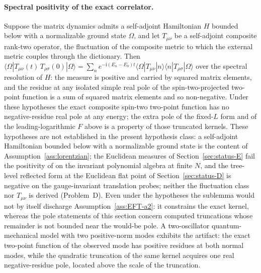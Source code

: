 \paragraph{Spectral positivity of the exact correlator.}
Suppose the matrix dynamics admits a self-adjoint Hamiltonian \(H\)
bounded below with a normalizable ground state \(\Omega\), and let
\(T_{\mu\nu}\) be a self-adjoint composite rank-two operator, the
fluctuation of the composite metric to which the external metric
couples through the dictionary. Then
\(\langle\Omega|T_{\mu\nu}(t)\,T_{\rho\sigma}(0)|\Omega\rangle
=\sum_n e^{-\mathrm i(E_n-E_0)t}
\langle\Omega|T_{\mu\nu}|n\rangle\langle n|T_{\rho\sigma}|\Omega
\rangle\) over the spectral resolution of \(H\): the measure is
positive and carried by squared matrix elements, and the residue at
any isolated simple real pole of the spin-two-projected two-point
function is a sum of squared matrix elements and so non-negative.
Under these hypotheses the exact composite spin-two two-point
function has no negative-residue real pole at any energy; the extra
pole of the fixed-\(L\) form and of the leading-logarithmic \(F\)
above is a property of those truncated kernels. These hypotheses
are not established in the present hypothesis class: a self-adjoint
Hamiltonian bounded below with a normalizable ground state is the
content of Assumption~\ref{ass:lorentzian}; the Euclidean measures
of Section~\ref{sec:status-E} fail the positivity of
\cite{OsterwalderSchrader1973,OsterwalderSchrader1975} on the
invariant polynomial algebra at finite \(N\), and the tree-level
reflected form at the Euclidean flat point of
Section~\ref{sec:status-D} is negative on the gauge-invariant
translation probes; neither the fluctuation class nor \(T_{\mu\nu}\)
is derived (Problem~D). Even under the hypotheses the sublemma
would not by itself discharge Assumption~\ref{ass:EFT-a2}: it
constrains the exact kernel, whereas the pole statements of this
section concern computed truncations whose remainder is not bounded
near the would-be pole. A two-oscillator quantum-mechanical model
with two positive-norm modes exhibits the artifact: the exact
two-point function of the observed mode has positive residues at
both normal modes, while the quadratic truncation of the same
kernel acquires one real negative-residue pole, located above the
scale of the truncation.

